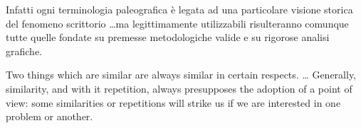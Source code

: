 \begin{displayquote}
Infatti ogni terminologia paleografica è legata ad una particolare visione
storica del fenomeno scrittorio \dots ma legittimamente utilizzabili risulteranno
comunque tutte quelle fondate su premesse metodo\-logiche valide e su rigorose
analisi grafiche.
\end{displayquote}
\begin{displayquote}
Two things which are similar are always similar in certain respects. \dots
Generally, similarity, and with it repetition, always presupposes the adoption
of a point of view: some similarities or repetitions will strike us if we are
interested in one problem or another.
\end{displayquote}

